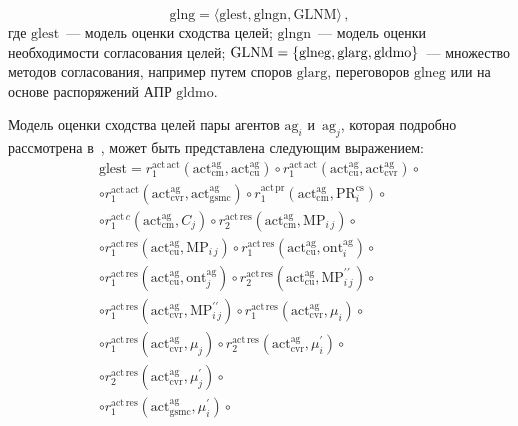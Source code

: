 \begin{multicols}{2}
  \noindent
  \begin{equation}
  \mathrm{glng} =\langle \mathrm{glest}, \mathrm{glngn}, 
\mathrm{GLNM}\rangle\,,
  \label{e5-kir}
  \end{equation}
где $\mathrm{glest}$~--- модель оценки сходства целей; $\mathrm{glngn}$~--- 
модель оценки необходимости согласования целей; $\mathrm{GLNM}\hm= \{ 
\mathrm{glneg}, \mathrm{glarg}, \mathrm{gldmo}\}$~--- множество методов 
согласования, например путем споров $\mathrm{glarg}$, переговоров  
$\mathrm{glneg}$ или на основе распоряжений АПР $\mathrm{gldmo}$.

  Модель оценки сходства целей пары агентов $\mathrm{ag}_i$ 
и~$\mathrm{ag}_j$, которая подробно рассмотрена в~\cite{10-kir}, может быть 
представлена следующим выражением:
  \begin{multline*}
  \!\!\mathrm{glest} =r_1^{\mathrm{act\,act}} \left(\mathrm{act^{ag}_{cm}}, 
\mathrm{act^{ag}_{cu}}\right) \circ 
r_1^{\mathrm{act\,act}}\left(\mathrm{act^{ag}_{cu}}, \mathrm{act^{ag}_{cvr}}\right) \circ\\
\circ   r_1^{\mathrm{act\,act}}\left(\mathrm{act^{ag}_{cvr}}, 
\mathrm{act^{ag}_{gsmc}}\right)\circ r_1^{\mathrm{act\,pr}}\left(\mathrm{act^{ag}_{cm}}, 
\mathrm{PR}_i^{\mathrm{cs}}\right)\circ\\
\circ  r_1^{\mathrm{act}\,c} 
\left(\mathrm{act^{ag}_{cm}}, C_j\right) \circ 
r_2^{\mathrm{act\,res}}\left(\mathrm{act_{cm}^{ag}}, \mathrm{MP}_{i\,j}\right)\circ\\
  \circ r_1^{\mathrm{act\,res}}\left(\mathrm{act^{ag}_{cu}}, \mathrm{MP}_{i\,j}\right)\circ
  r_1^{\mathrm{act\,res}}\left(\mathrm{act_{cu}^{ag}}, 
\mathrm{ont}_i^{\mathrm{ag}}\right) \circ \\
\circ
r_1^{\mathrm{act\,res}}\left(\mathrm{act^{ag}_{cu}}, \mathrm{ont}_j^{\mathrm{ag}}\right)\circ 
  r_2^{\mathrm{act\,res}}\left(\mathrm{act_{cu}^{ag}}, \mathrm{MP}_{i\,j}^{\prime\prime} 
\right)\circ\\
\circ r_1^{\mathrm{act\,res}}\left(\mathrm{act^{ag}_{cvr}}, 
\mathrm{MP}_{i\,j}^{\prime\prime}\right)\circ 
r_1^{\mathrm{act\,res}}\left(\mathrm{act^{ag}_{cvr}}, \mu_i\right)\circ \\
\circ
r_1^{\mathrm{act\,res}}\left(\mathrm{act^{ag}_{cvr}}, \mu_j\right)\circ
r_2^{\mathrm{act\,res}}\left(\mathrm{act^{ag}_{cvr}}, 
\mu_i^\prime\right) \circ\\
\circ
 r_2^{\mathrm{act\,res}}\left(\mathrm{act^{ag}_{cvr}},\mu_j^\prime\right) \circ \\
 \circ
r_1^{\mathrm{act\,res}}\left(\mathrm{act^{ag}_{gsmc}},\mu_i^\prime\right)\circ 

\end{multline*}
\end{multicols}
